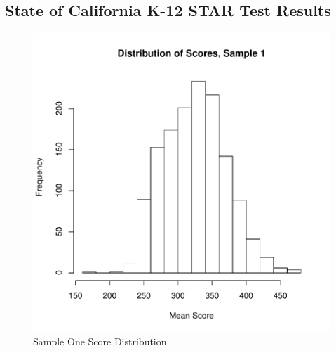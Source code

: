 \documentclass[twocolumn,english]{IEEEtran}
\theoremstyle{plain}
\theoremstyle{plain}
\begin{document}
\subsection{State of California K-12 STAR Test Results}

\begin{figure}[H]
		\begin{centering}
\includegraphics{proj3-fig_scores1}
		\caption{Sample One Score Distribution}
		\label{fig:Scores_Hist_One}
		\end{centering}
\end{figure}
\end{document}
